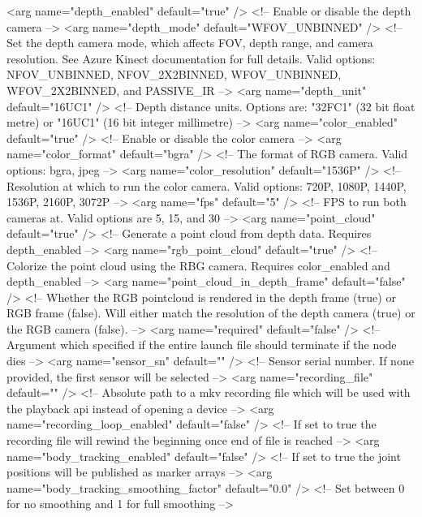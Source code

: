 \begin{roslaunch}[breaklines=true,label=lst:driverlaunch,caption={Azure ROS Driver Start}]
      <arg name="depth_enabled"           default="true" />           <!-- Enable or disable the depth camera -->
      <arg name="depth_mode"              default="WFOV_UNBINNED" />  <!-- Set the depth camera mode, which affects FOV, depth range, and camera resolution. See Azure Kinect documentation for full details. Valid options: NFOV_UNBINNED, NFOV_2X2BINNED, WFOV_UNBINNED, WFOV_2X2BINNED, and PASSIVE_IR -->
      <arg name="depth_unit"              default="16UC1" />          <!-- Depth distance units. Options are: "32FC1" (32 bit float metre) or "16UC1" (16 bit integer millimetre) -->
      <arg name="color_enabled"           default="true" />           <!-- Enable or disable the color camera -->
      <arg name="color_format"            default="bgra" />           <!-- The format of RGB camera. Valid options: bgra, jpeg -->
      <arg name="color_resolution"        default="1536P" />          <!-- Resolution at which to run the color camera. Valid options: 720P, 1080P, 1440P, 1536P, 2160P, 3072P -->
      <arg name="fps"                     default="5" />              <!-- FPS to run both cameras at. Valid options are 5, 15, and 30 -->
      <arg name="point_cloud"             default="true" />           <!-- Generate a point cloud from depth data. Requires depth_enabled -->
      <arg name="rgb_point_cloud"         default="true" />           <!-- Colorize the point cloud using the RBG camera. Requires color_enabled and depth_enabled -->
      <arg name="point_cloud_in_depth_frame" default="false" />        <!-- Whether the RGB pointcloud is rendered in the depth frame (true) or RGB frame (false). Will either match the resolution of the depth camera (true) or the RGB camera (false). -->
      <arg name="required"                default="false" />          <!-- Argument which specified if the entire launch file should terminate if the node dies -->
      <arg name="sensor_sn"               default="" />               <!-- Sensor serial number. If none provided, the first sensor will be selected -->
      <arg name="recording_file"          default="" />               <!-- Absolute path to a mkv recording file which will be used with the playback api instead of opening a device -->
      <arg name="recording_loop_enabled"  default="false" />          <!-- If set to true the recording file will rewind the beginning once end of file is reached -->
      <arg name="body_tracking_enabled"           default="false" />  <!-- If set to true the joint positions will be published as marker arrays -->
      <arg name="body_tracking_smoothing_factor"  default="0.0" />    <!-- Set between 0 for no smoothing and 1 for full smoothing -->

\end{roslaunch}

